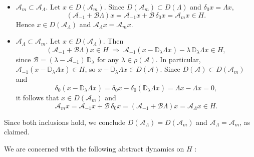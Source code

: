 \documentclass[10pt, a4]{amsart}
\theoremstyle{plain}
\theoremstyle{definition}
\theoremstyle{remark}
\numberwithin{equation}{section}
\begin{document}
\begin{itemize}
  \item \(\mathcal{A}_m \subset \mathcal{A}_{\Lambda}\).  
    Let \(x \in D(\mathcal{A}_m)\). Since \(D(\mathcal{A}_m)\subset D(\Lambda)\) and \(\delta_0 x = \Lambda x\),  
    \[
      (\mathcal{A}_{-1} + \mathcal{B}\Lambda)x
      = \mathcal{A}_{-1}x + \mathcal{B}\,\delta_0 x
      = \mathcal{A}_m x \in H.
    \]
    Hence \(x \in D(\mathcal{A}_{\Lambda})\) and \(\mathcal{A}_{\Lambda}x = \mathcal{A}_m x\).

  \item \(\mathcal{A}_{\Lambda} \subset \mathcal{A}_m\).  
    Let \(x \in D(\mathcal{A}_{\Lambda})\). Then
    \[
      (\mathcal{A}_{-1} + \mathcal{B}\Lambda)x \in H
      \;\Longrightarrow\;
      \mathcal{A}_{-1}(x - \mathbb{D}_{\lambda}\Lambda x)
      - \lambda\,\mathbb{D}_{\lambda}\Lambda x \in H,
    \]
    since \(\mathcal{B} = (\lambda - \mathcal{A}_{-1})\,\mathbb{D}_{\lambda}\) for any \(\lambda\in\rho(\mathcal{A})\).  
    In particular, \(\mathcal{A}_{-1}(x - \mathbb{D}_{\lambda}\Lambda x)\in H\), so \(x - \mathbb{D}_{\lambda}\Lambda x\in D(\mathcal{A})\).  
    Since \(D(\mathcal{A})\subset D(\mathcal{A}_m)\) and
    \[
      \delta_0(x - \mathbb{D}_{\lambda}\Lambda x)
      = \delta_0 x - \delta_0(\mathbb{D}_{\lambda}\Lambda x)
      = \Lambda x - \Lambda x = 0,
    \]
    it follows that \(x\in D(\mathcal{A}_m)\) and
    \[
      \mathcal{A}_m x
      = \mathcal{A}_{-1}x + \mathcal{B}\,\delta_0 x
      = (\mathcal{A}_{-1} + \mathcal{B}\Lambda)x
      = \mathcal{A}_{\Lambda}x\in H.
    \]
\end{itemize}

Since both inclusions hold, we conclude \(D(\mathcal{A}_{\Lambda}) = D(\mathcal{A}_m)\) and \(\mathcal{A}_{\Lambda} = \mathcal{A}_m\), as claimed.

We are concerned with the following abstract dynamics on $H$ : 
\end{document}
